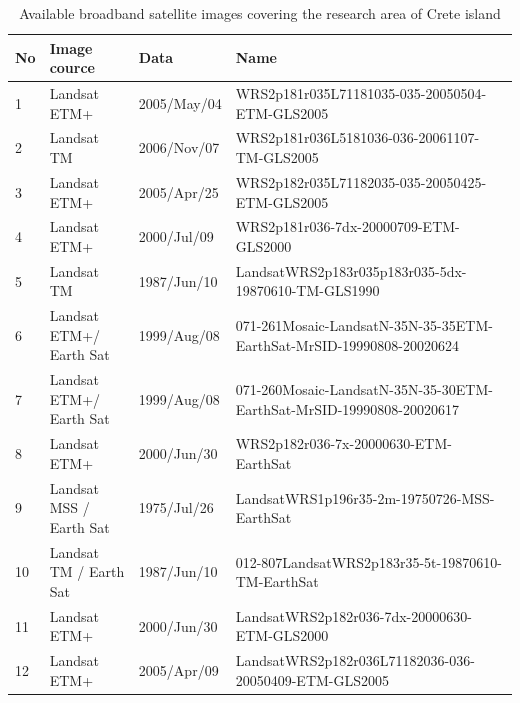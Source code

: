 \documentclass[10pt, a4paper]{article}
\begin{document}
\begin{appendices}
\begin{table}
	\caption{Available broadband satellite images covering the research area of Crete island}
	\centering
	 \begin{tabular}{| p{1cm} | p{3cm} | p{2cm} | p{5cm} |}
	    \hline
		    \textbf{No} & \textbf{Image cource} & \textbf{Data} & \textbf{Name} \\ \hline \hline
		     1 & Landsat ETM+ & 2005/May/04 & WRS2p181r035L71181035-035-20050504-ETM-GLS2005 \\ \hline
		     2 & Landsat TM & 2006/Nov/07 & WRS2p181r036L5181036-036-20061107-TM-GLS2005 \\ \hline
		     3 & Landsat ETM+ & 2005/Apr/25 & WRS2p182r035L71182035-035-20050425-ETM-GLS2005 \\ \hline
		     4 & Landsat ETM+ & 2000/Jul/09 & WRS2p181r036-7dx-20000709-ETM-GLS2000 \\ \hline
		     5 & Landsat TM & 1987/Jun/10 & LandsatWRS2p183r035p183r035-5dx-19870610-TM-GLS1990 \\ \hline
		     6 & Landsat ETM+/ Earth Sat & 1999/Aug/08 & 071-261Mosaic-LandsatN-35N-35-35ETM-EarthSat-MrSID-19990808-20020624 \\ \hline
		     7 & Landsat ETM+/ Earth Sat & 1999/Aug/08 & 071-260Mosaic-LandsatN-35N-35-30ETM-EarthSat-MrSID-19990808-20020617 \\ \hline
		     8 & Landsat ETM+ & 2000/Jun/30 & WRS2p182r036-7x-20000630-ETM-EarthSat \\ \hline
		     9 & Landsat MSS / Earth Sat & 1975/Jul/26 & LandsatWRS1p196r35-2m-19750726-MSS-EarthSat \\ \hline
		    10 & Landsat TM / Earth Sat & 1987/Jun/10 & 012-807LandsatWRS2p183r35-5t-19870610-TM-EarthSat \\ \hline
		    11 & Landsat ETM+ & 2000/Jun/30 & LandsatWRS2p182r036-7dx-20000630-ETM-GLS2000 \\ \hline
		    12 & Landsat ETM+ & 2005/Apr/09 & LandsatWRS2p182r036L71182036-036-20050409-ETM-GLS2005 \\ \hline
	  \end{tabular}
	\label{tab:34}
\end{table}


\end{appendices}
\end{document}
